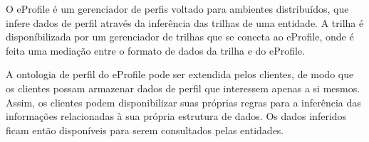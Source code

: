 O eProfile é um gerenciador de perfis voltado para ambientes distribuídos, que infere dados de perfil através da inferência das trilhas de uma entidade. A trilha é disponíbilizada por um gerenciador de trilhas que se conecta ao eProfile, onde é feita uma mediação entre o formato de dados da trilha e do eProfile.

A ontologia de perfil do eProfile pode ser extendida pelos clientes, de modo que os clientes possam armazenar dados de perfil que interessem apenas a si mesmos. Assim, os clientes podem disponibilizar suas próprias regras para a inferência das informações relacionadas à sua própria estrutura de dados. Os dados inferidos ficam então disponíveis para serem consultados pelas entidades.

